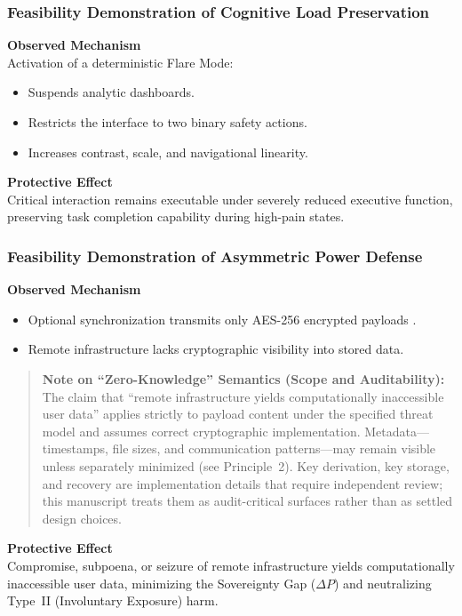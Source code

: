 \documentclass[12pt]{article}
\begin{document}
\subsubsection{Feasibility Demonstration of Cognitive Load Preservation}
\textbf{Observed Mechanism}\\
Activation of a deterministic Flare Mode:
\begin{itemize}
\item Suspends analytic dashboards.
\item Restricts the interface to two binary safety actions.
\item Increases contrast, scale, and navigational linearity.
\end{itemize}
\textbf{Protective Effect}\\
Critical interaction remains executable under severely reduced executive function, preserving task completion capability during high-pain states.

\subsubsection{Feasibility Demonstration of Asymmetric Power Defense}
\textbf{Observed Mechanism}
\begin{itemize}
\item Optional synchronization transmits only AES-256 encrypted payloads \cite{nistfips197upd1,nistsp80038a}.
\item Remote infrastructure lacks cryptographic visibility into stored data.
\end{itemize}

\begin{quote}
\textbf{Note on ``Zero-Knowledge'' Semantics (Scope and Auditability):} The claim that ``remote infrastructure yields computationally inaccessible user data'' applies strictly to payload content under the specified threat model and assumes correct cryptographic implementation. Metadata---timestamps, file sizes, and communication patterns---may remain visible unless separately minimized (see Principle~2). Key derivation, key storage, and recovery are implementation details that require independent review; this manuscript treats them as audit-critical surfaces rather than as settled design choices.
\end{quote}

\textbf{Protective Effect}\\
Compromise, subpoena, or seizure of remote infrastructure yields computationally inaccessible user data, minimizing the Sovereignty Gap ($\Delta P$) and neutralizing Type~II (Involuntary Exposure) harm.
\end{document}
